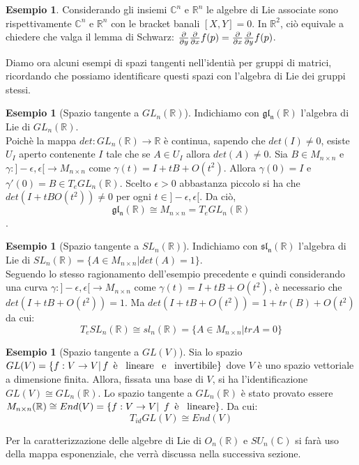 \documentclass[12pt,a4paper]{report}
\theoremstyle{definition}
\theoremstyle{definition}
\newtheorem{Ex}[Def]{Esempio}
\theoremstyle{definition}
\theoremstyle{remark}
\begin{document}
\begin{Ex}
	Considerando gli insiemi $\mathbb{C}^n$ e $\mathbb{R}^n$ le algebre di Lie associate sono rispettivamente $\mathbb{C}^n$ e $\mathbb{R}^n$ con le bracket banali $[X,Y]=0$. In $\mathbb{R}^2$, ciò equivale a chiedere che valga il lemma di Schwarz: ${\partial\over\partial y}{\partial\over\partial x}f(p)={\partial\over\partial x}{\partial\over\partial y}f(p)$.
\end{Ex}
Diamo ora alcuni esempi di spazi tangenti nell'identià per gruppi di matrici, ricordando che possiamo identificare questi spazi con l'algebra di Lie dei gruppi stessi.
\begin{Ex}[Spazio tangente a $GL_n(\mathbb{R})$]
	Indichiamo con $\mathfrak{gl_n(\mathbb{R})}$ l'algebra di Lie di $GL_n(\mathbb{R})$.
	\\
	Poichè la mappa $det:GL_n(\mathbb{R})\rightarrow\mathbb{R}$ è continua, sapendo che $det(I)\neq 0$, esiste $U_I$ aperto contenente $I$ tale che se $A\in U_I$ allora $det(A)\neq 0$. Sia $B\in M_{n\times n}$ e $\gamma:]-\epsilon,\epsilon[\rightarrow M_{n\times n}$ come $\gamma(t)=I+tB+O(t^2)$. Allora $\gamma(0)=I$ e $\gamma'(0)=B\in T_eGL_n(\mathbb{R})$. Scelto $\epsilon>0$ abbastanza piccolo si ha che $det(I+tBO(t^2))\neq 0$ per ogni $t\in]-\epsilon,\epsilon[$. Da ciò, $$\mathfrak{gl_n(\mathbb{R})}\cong M_{n\times n}= T_eGL_n(\mathbb{R})$$.
\end{Ex}
\begin{Ex}[Spazio tangente a $SL_n(\mathbb{R})$]
	Indichiamo con $\mathfrak{sl_n(\mathbb{R})}$ l'algebra di Lie di $SL_n(\mathbb{R})=\{A\in M_{n\times n}|det(A)=1\}$.\\
	Seguendo lo stesso ragionamento dell'esempio precedente e quindi considerando una curva $\gamma:]-\epsilon,\epsilon[\rightarrow M_{n\times n}$ come $\gamma(t)=I+tB+O(t^2)$, è necessario che $det(I+tB+O(t^2))=1$. Ma $det(I+tB+O(t^2))=1+tr(B)+O(t^2)$ da cui: $$T_eSL_n(\mathbb{R})\cong sl_n(\mathbb{R})=\{A\in M_{n\times n}|trA=0\}$$ 
\end{Ex}
\begin{Ex}[Spazio tangente a $GL(V)$]
	Sia lo spazio $GL(V)=\{f:V\rightarrow V|\, \textnormal{$f$\,  è \, lineare \, e \, invertibile}\}$ dove $V$ è uno spazio vettoriale a dimensione finita. Allora, fissata una base di $V$, si ha l'identificazione $GL(V)\cong GL_n(\mathbb{R})$. Lo spazio tangente a $GL_n(\mathbb{R})$ è stato provato essere $M_{n\times n}(\mathbb{R})\cong End(V)=\{f:V\rightarrow V|\textnormal{\, $f$\, è \, lineare}\}$. Da cui: 
	$$T_{id}GL(V)\cong End(V)$$ 
\end{Ex}
Per la caratterizzazione delle algebre di Lie di $O_n(\mathbb{R})$ e $SU_n(\mathbb{C})$ si farà uso della mappa esponenziale, che verrà discussa nella successiva sezione.
\end{document}
